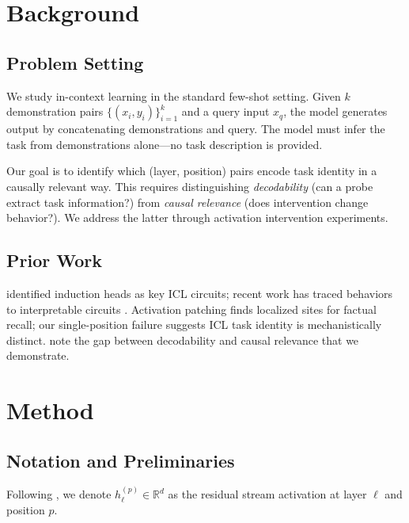 \documentclass{article}
\begin{document}
\section{Background}
\label{sec:background}

\subsection{Problem Setting}

We study in-context learning in the standard few-shot setting. Given $k$ demonstration pairs $\{(x_i, y_i)\}_{i=1}^k$ and a query input $x_q$, the model generates output by concatenating demonstrations and query. The model must infer the task from demonstrations alone---no task description is provided.

Our goal is to identify which (layer, position) pairs encode task identity in a causally relevant way. This requires distinguishing \emph{decodability} (can a probe extract task information?) from \emph{causal relevance} (does intervention change behavior?). We address the latter through activation intervention experiments.

\subsection{Prior Work}

\citet{olsson2022context} identified induction heads as key ICL circuits; recent work has traced behaviors to interpretable circuits \citep{wang2023interpretability,conmy2023towards}. Activation patching \citep{vig2020investigating,meng2022locating} finds localized sites for factual recall; our single-position failure suggests ICL task identity is mechanistically distinct. \citet{belinkov2019analysis} note the gap between decodability and causal relevance that we demonstrate.

\section{Method}
\label{sec:method}

\subsection{Notation and Preliminaries}

Following \citet{elhage2021mathematical}, we denote $h_\ell^{(p)} \in \mathbb{R}^d$ as the residual stream activation at layer $\ell$ and position $p$.
\end{document}
